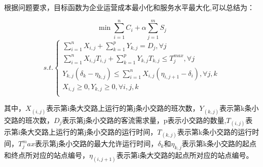 \documentclass[UTF8]{ctexart}
\begin{document}
根据问题要求，目标函数为企业运营成本最小化和服务水平最大化,可以总结为：\par
$$
\min \sum_{i=1}^n{C_i}+\alpha \sum_{j=1}^m{S_j}
$$
$$
s.t.\left\{ \begin{array}{c}
	\sum_{i=1}^n{X_{i,j}}+\sum_{k=1}^p{Y_{k,j}}=D_j,\forall j\\
	\sum_{i=1}^n{X_{i,j}}T_{i,j}+\sum_{k=1}^p{Y_{k,j}}T_{k,j}\le T_{j}^{max},\forall j\\
	Y_{k,j}(\delta _k-\eta _{k,j})\le \sum_{i=1}^n{X_{i,j}}(\eta _{i,j+1}-\delta _i),\forall j,k\\
	X_{i,j}\ge 0,Y_{k,j}\ge 0,\forall i,j,k\\
\end{array} \right. 
$$\par
其中，$X_(i,j)$表示第i条大交路上运行的第j条小交路的班次数，$Y_(k,j)$表示第k条小交路的班次数，$D_j$表示第j条小交路的客流需求量，p表示小交路的数量,$T_(i,j)$表示第i条大交路上运行的第j条小交路的运行时间，$T_(k,j)$表示第k条小交路的运行时间，$T_j^max$表示第j条小交路的最大允许运行时间，$\delta _k$和$\eta _{k,j}$表示第k条小交路的起点和终点所对应的站点编号，$\eta_(i,j+1)$表示第i条大交路的起点所对应的站点编号。
\end{document}
